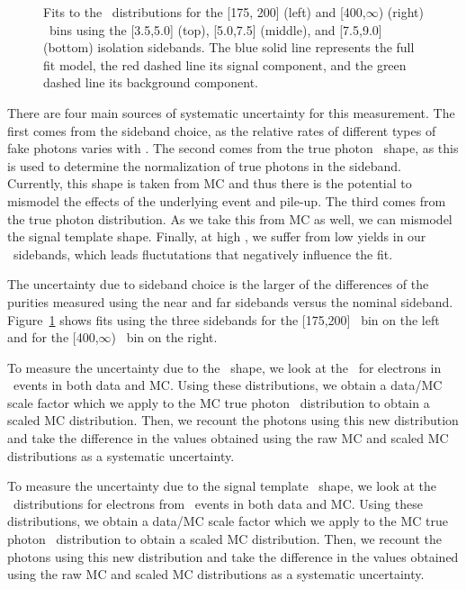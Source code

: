 \begin{figure}[htbp]
{  }
  \caption{
    Fits to the \sieie\ distributions for the [175, 200] (left) and [400,$\infty$) (right) \pt\ bins using the [3.5,5.0] (top), [5.0,7.5] (middle), and [7.5,9.0] (bottom) isolation sidebands.
      The blue solid line represents the full fit model, the red dashed line its signal component, and the green dashed line its background component.
    }
    \label{fig:impurity-sideband}
\end{figure}

There are four main sources of systematic uncertainty for this measurement. 
The first comes from the sideband choice, as the relative rates of different types of fake photons varies with \ICH. 
The second comes from the true photon \ICH\ shape, as this is used to determine the normalization of true photons in the sideband. 
Currently, this shape is taken from MC and thus there is the potential to mismodel the effects of the underlying event and pile-up. 
The third comes from the true photon \sieie distribution. 
As we take this from MC as well, we can mismodel the signal template shape. 
Finally, at high \pt, we suffer from low yields in our \ICH\ sidebands, which leads fluctutations that negatively influence the fit.

The uncertainty due to sideband choice is the larger of the differences of the purities measured using the near and far sidebands versus the nominal sideband. 
Figure~\ref{fig:impurity-sideband} shows fits using the three sidebands for the [175,200] \pt\ bin on the left and for the [400,$\infty$) \pt\ bin on the right.

To measure the uncertainty due to the \ICH\ shape, we look at the \ICH\ for electrons in \Zee\ events in both data and MC. 
Using these distributions, we obtain a data/MC scale factor which we apply to the MC true photon \ICH\ distribution to obtain a scaled MC distribution. 
Then, we recount the photons using this new distribution and take the difference in the values obtained using the raw MC and scaled MC distributions as a systematic uncertainty.

To measure the uncertainty due to the signal template \sieie\ shape, we look at the \sieie\ distributions for electrons from \Zee\ events in both data and MC.
Using these distributions, we obtain a data/MC scale factor which we apply to the MC true photon \sieie\ distribution to obtain a scaled MC distribution.
Then, we recount the photons using this new distribution and take the difference in the values obtained using the raw MC and scaled MC distributions as a systematic uncertainty. 

